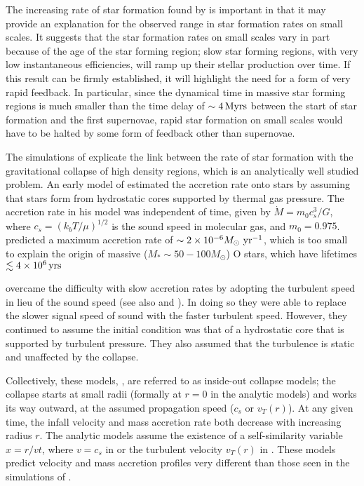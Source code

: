 \documentclass[../dissertation.tex]{subfiles}
\begin{document}
The increasing rate of star formation found by \citet{2015ApJ...800...49L} is important 
in that it may provide an explanation for the observed range in star formation rates on 
small scales.  It suggests that the star formation rates on small scales 
vary in part because of the age of the star forming region; slow star forming 
regions, with very low instantaneous efficiencies, will ramp up their stellar production over time. If this result
can be firmly established, it will highlight the need for a form of very rapid 
feedback. In particular, since the dynamical time in massive star forming regions 
is much smaller than the time delay of $\sim 4{\,\rm Myrs}$ between the start of star 
formation and the first supernovae, rapid star formation on small scales would 
have to be halted by some form of feedback other than supernovae. 

The simulations of  \citet{2015ApJ...800...49L} explicate the link between the rate of star formation with the gravitational collapse of high density regions, which  is  an analytically well studied problem. 
An early model of \citet{1977ApJ...214..488S} estimated 
the accretion rate onto stars by assuming that stars form from hydrostatic cores 
supported by thermal gas pressure. The accretion rate in his model was independent
of time, given by $\dot{M} = m_0c_s^3/G$, where $c_s = (k_b T / \mu)^{1/2}$  is the sound
speed in molecular gas, and $m_0 = 0.975$. \citet{1977ApJ...214..488S} predicted a 
maximum accretion rate of $\sim 2\times10^{-6} M_\odot\,\,\rm yr^{-1}$, which is too small to explain 
the origin of massive ($M_*\sim50-100M_\odot$) O stars, which have lifetimes $\lesssim 4\times10^6\,\rm yrs$

\citet{1992ApJ...396..631M} overcame the difficulty with slow accretion rates by adopting 
the turbulent speed in lieu of the sound speed (see also \citet{1997ApJ...476..750M} and
\citet{2003ApJ...585..850M}). In doing so they were able to replace the slower signal 
speed of sound with the faster turbulent speed. However, they continued to assume 
the initial condition was that of a hydrostatic core that is supported by
turbulent pressure. They also assumed that the turbulence is static and unaffected by the collapse.  

Collectively, these models, \citep{1977ApJ...214..488S,1992ApJ...396..631M,1997ApJ...476..750M,2003ApJ...585..850M}, are referred to as inside-out collapse models; the collapse starts at small radii (formally at $r=0$ in the analytic models) and works its way outward, at the assumed propagation speed ($c_s$ or $v_T(r)$).  At any given time, the infall velocity and mass accretion rate both decrease with increasing radius $r$.  The analytic models assume the existence of a self-similarity variable $x = r/vt$, where $v=c_s$ in \citet{1977ApJ...214..488S} or the turbulent velocity $v_T(r)$ in \citet{1992ApJ...396..631M,1997ApJ...476..750M,2003ApJ...585..850M}.  
These models predict velocity and mass accretion profiles very different than those seen 
in the simulations of \citet{2015ApJ...800...49L}.
\end{document}
